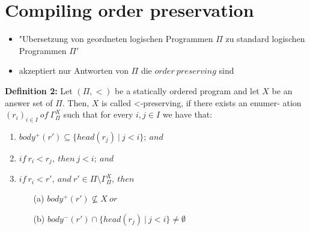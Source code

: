 \section{Compiling order preservation}

\begin{frame}
  \begin{itemize}
    \item "Ubersetzung von geordneten logischen Programmen $\Pi$ zu standard logischen Programmen $\Pi'$
    \item akzeptiert nur Antworten von $\Pi$ die $order~preserving$ sind
  \end{itemize}
\end{frame}


\begin{frame}
  \begin{block}{\textbf{Definition 2:}}
    Let $(\Pi, <)$ be a statically ordered program and
    let $X$ be an answer set of $\Pi$.
    Then, $X$ is called <-preserving, if there exists an enumer-
    ation $(r_i)_{i \in I}~of~\Gamma^{X}_{\Pi}$  such that for every $i, j \in I$ we have that:
    \begin{enumerate}
      \item $body^+(r') \subseteq \{head(r_j)~|~j < i\};~and$
      \item $if~r_i < r_j,~then~j < i;~and$
      \item $if~r_i < r',~and~r' \in \Pi\setminus\Gamma^{X}_{\Pi},~then$
        \begin{itemize}
          \item[(a)] $body^+(r') \nsubseteq X~or$
          \item[(b)] $body^-(r') \cap \{head(r_j)~|~j < i\} \neq \emptyset$
        \end{itemize}
    \end{enumerate}
  \end{block}
\end{frame}


